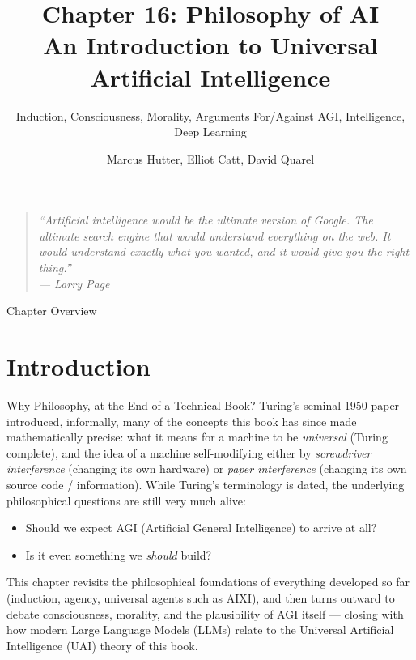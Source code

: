 \documentclass[aspectratio=169,10pt]{beamer}
\title[Ch.\,16 Philosophy of AI]{%
  \textbf{Chapter 16: Philosophy of AI}\\
  \normalsize An Introduction to Universal Artificial Intelligence}
\subtitle{Induction, Consciousness, Morality, Arguments For/Against AGI, Intelligence, Deep Learning}
\author{Marcus Hutter, Elliot Catt, David Quarel}
\institute{Taylor \& Francis / CRC Press, 2024}
\date{}
\begin{document}
\begin{frame}
  \titlepage
  \vspace{-1.5em}
  \begin{quote}
    \small\itshape ``Artificial intelligence would be the ultimate version of
    Google. The ultimate search engine that would understand everything on
    the web. It would understand exactly what you wanted, and it would give
    you the right thing.''\\
    \hfill --- Larry Page
  \end{quote}
\end{frame}

\begin{frame}{Chapter Overview}
  \tableofcontents
\end{frame}


\section{Introduction}

\begin{frame}{Why Philosophy, at the End of a Technical Book?}
  Turing's seminal 1950 paper introduced, informally, many of the concepts
  this book has since made mathematically precise: what it means for a
  machine to be \emph{universal} (Turing complete), and the idea of a
  machine self-modifying either by \emph{screwdriver interference}
  (changing its own hardware) or \emph{paper interference} (changing its
  own source code / information). While Turing's terminology is dated, the
  underlying philosophical questions are still very much alive:

  \begin{itemize}
    \item Should we expect AGI (Artificial General Intelligence) to arrive
      at all?
    \item Is it even something we \emph{should} build?
  \end{itemize}

  \vspace{0.5em}
  This chapter revisits the philosophical foundations of everything
  developed so far (induction, agency, universal agents such as AIXI), and
  then turns outward to debate consciousness, morality, and the plausibility
  of AGI itself --- closing with how modern Large Language Models (LLMs)
  relate to the Universal Artificial Intelligence (UAI) theory of this book.
\end{frame}
\end{document}
